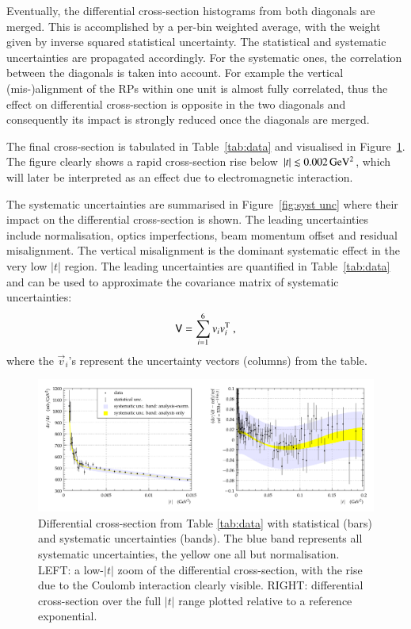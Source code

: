 Eventually, the differential cross-section histograms from both diagonals are merged. This is accomplished by a per-bin weighted average, with the weight given by inverse squared statistical uncertainty. The statistical and systematic uncertainties are propagated accordingly. For the systematic ones, the correlation between the diagonals is taken into account. For example the vertical (mis-)alignment of the RPs within one unit is almost fully correlated, thus the effect on differential cross-section is opposite in the two diagonals and consequently its impact is strongly reduced once the diagonals are merged.

The final cross-section is tabulated in Table~\ref{tab:data} and visualised in Figure~\ref{fig:dsdt}. The figure clearly shows a rapid cross-section rise below $|t| \lesssim 0.002\,{\rm GeV^2}$, which will later be interpreted as an effect due to electromagnetic interaction.

The systematic uncertainties are summarised in Figure~\ref{fig:syst unc} where their impact on the differential cross-section is shown. The leading uncertainties include normalisation, optics imperfections, beam momentum offset and residual misalignment. The vertical misalignment is the dominant systematic effect in the very low $|t|$ region. The leading uncertainties are quantified in Table~\ref{tab:data} and can be used to approximate the covariance matrix of systematic uncertainties:
\begin{equation}
\label{eq:covar mat}
\mathsf{V} = \sum_{i=1}^{6} v_i v_i^{\rm T}\ ,
\end{equation}
where the $\vec v_i$'s represent the uncertainty vectors (columns) from the table.







\begin{figure}
\vskip-5mm
\begin{center}
\includegraphics[width=18cm]{fig/t_dist_tabulation.pdf}
\vskip-3mm
\caption{%
Differential cross-section from Table \ref{tab:data} with statistical (bars) and systematic uncertainties (bands). The blue band represents all systematic uncertainties, the yellow one all but normalisation. LEFT: a low-$|t|$ zoom of the differential cross-section, with the rise due to the Coulomb interaction clearly visible. RIGHT: differential cross-section over the full $|t|$ range plotted relative to a reference exponential.
}
\label{fig:dsdt}
\end{center}
\end{figure}


